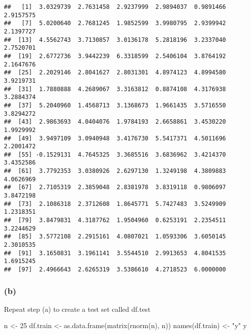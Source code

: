 \documentclass[
]{article}
\newenvironment{Shaded}{\begin{snugshade}}{\end{snugshade}}
\newcommand{\DecValTok}[1]{\textcolor[rgb]{0.00,0.00,0.81}{#1}}
\newcommand{\FunctionTok}[1]{\textcolor[rgb]{0.00,0.00,0.00}{#1}}
\newcommand{\NormalTok}[1]{#1}
\newcommand{\OtherTok}[1]{\textcolor[rgb]{0.56,0.35,0.01}{#1}}
\newcommand{\StringTok}[1]{\textcolor[rgb]{0.31,0.60,0.02}{#1}}
\begin{document}
\begin{verbatim}
##   [1]  3.0329739  2.7631458  2.9237999  2.9894037  0.9891466  2.9157575
##   [7]  5.0200640  2.7681245  1.9852599  3.9980795  2.9399942  2.1397727
##  [13]  4.5562743  3.7130857  3.0136178  5.2818196  3.2337040  2.7520701
##  [19]  2.6772736  3.9442239  6.3318599  2.5406104  3.8764192  2.1647676
##  [25]  2.2029146  2.8041627  2.8031301  4.8974123  4.8994580  3.9219731
##  [31]  1.7880888  4.2689067  3.3163812  0.8874108  4.3176938  3.2884374
##  [37]  5.2040960  1.4568713  3.1368673  1.9661435  3.5716550  3.8294272
##  [43]  2.9863693  4.0404076  1.9784193  2.6658861  3.4530220  1.9929992
##  [49]  3.9497109  3.0940948  3.4176730  5.5417371  4.5011696  2.2001472
##  [55] -0.1529131  4.7645325  3.3685516  3.6836962  3.4214370  3.4352586
##  [61]  3.7792353  3.0380926  2.6297130  1.3249198  4.3809883  4.0626969
##  [67]  2.7105319  2.3859048  2.8381978  3.8319118  0.9806097  3.8472198
##  [73]  2.1086318  2.3712608  1.8645771  5.7427483  3.5249909  1.2318351
##  [79]  3.8479831  4.3187762  1.9504960  0.6253191  2.2354511  3.2244629
##  [85]  3.5772108  2.2915161  4.0807021  1.0593306  3.6050145  2.3010535
##  [91]  3.1650831  3.1961141  3.5544510  2.9913653  4.8041535  1.6915245
##  [97]  2.4966643  2.6265319  3.5386610  4.2718523  6.0000000
\end{verbatim}

\hypertarget{b-5}{%
\subsubsection{(b)}\label{b-5}}

Repeat step (a) to create a test set called df.test

\begin{Shaded}
\begin{Highlighting}[]
\NormalTok{n }\OtherTok{\textless{}{-}} \DecValTok{25}
\NormalTok{df.train }\OtherTok{\textless{}{-}} \FunctionTok{as.data.frame}\NormalTok{(}\FunctionTok{matrix}\NormalTok{(}\FunctionTok{rnorm}\NormalTok{(n), n))}
\FunctionTok{names}\NormalTok{(df.train) }\OtherTok{\textless{}{-}} \StringTok{"y"}
\NormalTok{y}
\end{Highlighting}
\end{Shaded}
\end{document}
